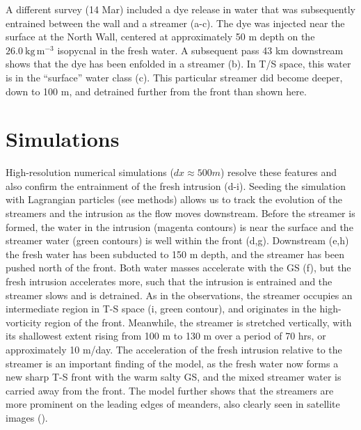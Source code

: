 \documentclass[draft,grl]{agutex2015}
\begin{document}
\begin{article}

A different survey (14 Mar) included a dye release in water that was subsequently entrained between the wall and a streamer (a-c).  The dye was injected near the surface at the North Wall, centered at approximately 50 m depth on the $26.0 \ \mathrm{kg\,m^{-3}}$ isopycnal in the fresh water.  A subsequent pass 43 km downstream shows that the dye has been enfolded in a streamer (b).  In T/S space, this water is in the ``surface'' water class (c).  This particular streamer did become deeper, down to 100 m, and detrained further from the front than shown here.  
    

\section{Simulations}

High-resolution numerical simulations ($dx\approx 500 m$) resolve these features and also confirm the entrainment of the fresh intrusion (d-i). Seeding the simulation with Lagrangian particles (see methods) allows us to track the evolution of the streamers and the intrusion as the flow moves downstream.  Before the streamer is formed, the water in the intrusion (magenta contours) is near the surface and the streamer water (green contours) is well within the front (d,g).  Downstream (e,h) the fresh water has been subducted to 150 m depth, and the streamer has been pushed north of the front.  Both water masses accelerate with the  GS  (f), but the fresh intrusion accelerates more, such that the intrusion is entrained and the streamer slows and is detrained.  As in the observations, the streamer occupies an intermediate region in T-S space (i, green contour), and originates in the high-vorticity region of the front.  Meanwhile, the streamer is stretched vertically, with its shallowest extent rising from 100 m to 130 m over a period of 70 hrs, or approximately 10 m/day. The acceleration of the fresh intrusion relative to the streamer is an important finding of the model, as the fresh water now forms a new sharp T-S front with the warm salty GS, and the  mixed streamer water is carried away from the front.  The model further shows that the streamers are more prominent on the leading edges of meanders, also clearly seen in satellite images ().  


\end{article}
\end{document}
